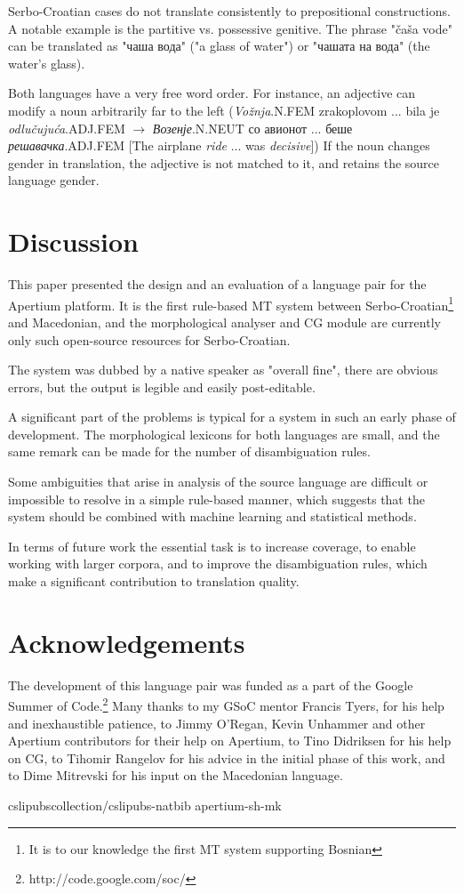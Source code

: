\documentclass{book}
\begin{document}
Serbo-Croatian cases do not translate consistently to prepositional constructions.
A notable example is the partitive vs. possessive genitive. The phrase "čaša vode"
can be translated as "чаша вода" ("a glass of water") or "чашата на вода" 
(the water's glass).

Both languages have a very free word order. For instance, an 
adjective can modify a noun arbitrarily far to the left
(\emph{Vožnja}.N.FEM zrakoplovom ... bila je \emph{odlučujuća}.ADJ.FEM $\rightarrow$ \emph{Возенје}.N.NEUT со авионот ... беше \emph{решавачка}.ADJ.FEM  [The airplane \emph{ride} ... was \emph{decisive}])
If the noun 
changes gender in translation, the adjective is not matched to it, and retains
the source language gender.

\section{Discussion}
This paper presented the design and an evaluation of a language pair for the Apertium platform.
It is the first rule-based MT system between Serbo-Croatian\footnote{It is to our knowledge the first 
MT system supporting Bosnian} and Macedonian, and the morphological
analyser and CG module are currently only such open-source resources for Serbo-Croatian.

The system was dubbed by a native speaker as "overall fine", there are obvious errors, but the output is legible and easily post-editable. 

A significant part of the problems is typical for a system in such an early phase of 
development. The morphological lexicons for both languages are small, and 
the same remark can be made for the number of disambiguation rules. 

Some ambiguities that arise in analysis of the source language are 
difficult or impossible to resolve in a simple rule-based manner, which suggests that 
the system should be combined with machine learning and statistical methods.

In terms of future work the essential task is to increase coverage, to enable working
with larger corpora, and to improve the disambiguation rules, which make a significant
contribution to translation quality.

\section*{Acknowledgements}
The development of this language pair was funded as a part of the 
Google Summer of Code.\footnote{http://code.google.com/soc/}
Many thanks to my GSoC mentor Francis Tyers, for his help and inexhaustible
patience, to Jimmy O'Regan, Kevin Unhammer and other Apertium contributors for
their help on Apertium, to Tino Didriksen for his help on CG, to Tihomir Rangelov
for his advice in the initial phase of this work, and to Dime Mitrevski
for his input on the Macedonian language.

 {cslipubscollection/cslipubs-natbib}
 {apertium-sh-mk}

\backmatter
\end{document}

